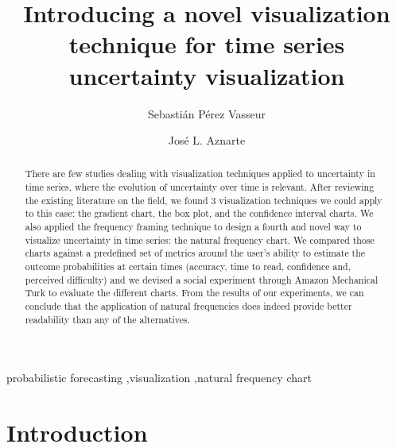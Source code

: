 \documentclass[a4paper,3p,sort&compress]{elsarticle}
\begin{document}
\linenumbers

\newcommand{\no}{NO\textsubscript{2}\xspace}
\newcommand{\ts}{\textsuperscript}

\begin{frontmatter}

  \title{Introducing a novel visualization technique for time series uncertainty visualization}


  \author{Sebasti\'an P\'erez Vasseur}
  \author{Jos\'e L. Aznarte}
  \address{Artificial Intelligence Department\\Universidad Nacional de
    Educaci\'on a Distancia --- UNED\\c/ Juan del Rosal, 16, Madrid, Spain}


\begin{abstract}

There are few studies dealing with visualization techniques applied to uncertainty in time series, 
where the evolution of uncertainty over time is relevant. After reviewing the existing
literature on the field, we found 3 visualization techniques we could apply to
this case: the gradient chart, the box plot, and the confidence interval charts.
We also applied the frequency framing technique to design a fourth and novel way 
to visualize uncertainty in time series: the natural frequency chart. We compared those charts 
against a predefined set of metrics around the user's ability to estimate the outcome 
probabilities at certain times (accuracy, time to read, confidence and, perceived difficulty) 
and we devised a social experiment through Amazon Mechanical Turk to evaluate the different charts. 
From the results of our experiments, we can conclude that the application of natural 
frequencies does indeed provide better readability than any of the alternatives.

\end{abstract}

\begin{keyword}
probabilistic forecasting \sep visualization \sep natural frequency chart
\end{keyword}

\end{frontmatter}


\section{Introduction} 
\label{sec:intro}
\end{document}
